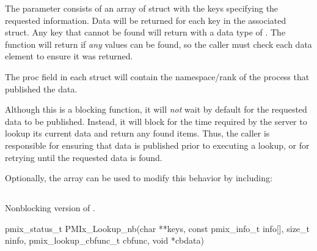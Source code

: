 The  parameter consists of an array of  struct with the keys specifying the requested information.
Data will be returned for each key in the associated  struct.
Any key that cannot be found will return with a data type of .
The function will return  if \emph{any} values can be found, so the caller must check each data element to ensure it was returned.

The proc field in each  struct will contain the namespace/rank of the process that published the data.

\adviceuserstart
Although this is a blocking function, it will \emph{not} wait by default for the requested data to be published.
Instead, it will block for the time required by the server to lookup its current data and return any found items.
Thus, the caller is responsible for ensuring that data is published prior to executing a lookup, or for retrying until the requested data is found.
\adviceuserend

Optionally, the  array can be used to modify this behavior by including:


\subsection{}

\summary

Nonblocking version of .

\format

\cspecificstart
\begin{codepar}
pmix_status_t
PMIx_Lookup_nb(char **keys,
               const pmix_info_t info[], size_t ninfo,
               pmix_lookup_cbfunc_t cbfunc, void *cbdata)
\end{codepar}
\cspecificend

\begin{arglist}
\end{arglist}

